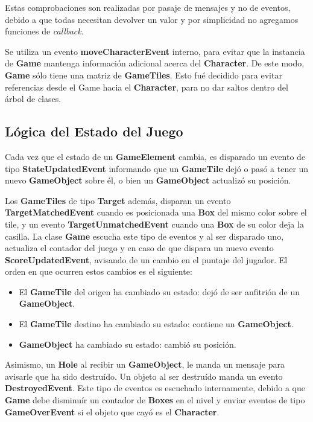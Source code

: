 \documentclass[a4paper,12pt,titlepage]{article}
\begin{document}
Estas comprobaciones son realizadas por pasaje de mensajes y no de eventos, debido a que todas necesitan devolver un valor y por simplicidad no agregamos funciones de \emph{callback}.

Se utiliza un evento \textbf{moveCharacterEvent} interno, para evitar que la instancia de \textbf{Game} mantenga información adicional acerca del \textbf{Character}. De este modo, \textbf{Game} sólo tiene una matriz de \textbf{GameTiles}. Esto fué decidido para evitar referencias desde el Game hacia el \textbf{Character}, para no dar saltos dentro del árbol de clases.

\subsection{Lógica del Estado del Juego}

Cada vez que el estado de un \textbf{GameElement} cambia, es disparado un evento de tipo \textbf{StateUpdatedEvent} informando que un \textbf{GameTile} dejó o pasó a tener un nuevo \textbf{GameObject} sobre él, o bien un \textbf{GameObject} actualizó su posición.

Los \textbf{GameTiles} de tipo \textbf{Target} además, disparan un evento \textbf{TargetMatchedEvent} cuando es posicionada una \textbf{Box} del mismo color sobre el tile, y un evento \textbf{TargetUnmatchedEvent} cuando una \textbf{Box} de su color deja la casilla. La clase \textbf{Game} escucha este tipo de eventos y al ser disparado uno, actualiza el contador del juego y en caso de que dispara un nuevo evento \textbf{ScoreUpdatedEvent}, avisando de un cambio en el puntaje del jugador. El orden en que ocurren estos cambios es el siguiente:

\begin{itemize}
	\item El \textbf{GameTile} del origen ha cambiado su estado: dejó de ser anfitrión de un \textbf{GameObject}.
	\item El \textbf{GameTile} destino ha cambiado su estado: contiene un \textbf{GameObject}.
	\item \textbf{GameObject} ha cambiado su estado: cambió su posición.
\end{itemize}

Asimismo, un \textbf{Hole} al recibir un \textbf{GameObject}, le manda un mensaje para avisarle que ha sido destruído. Un objeto al ser destruído manda un evento \textbf{DestroyedEvent}. Este tipo de eventos es escuchado internamente, debido a que \textbf{Game} debe disminuír un contador de \textbf{Boxes} en el nivel y enviar eventos de tipo \textbf{GameOverEvent} si el objeto que cayó es el \textbf{Character}.
\end{document}
